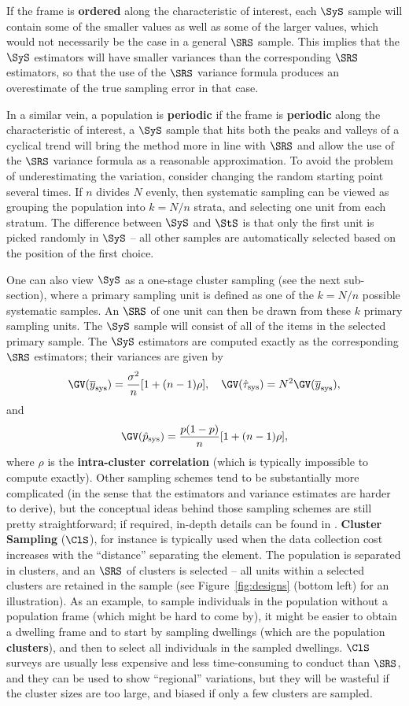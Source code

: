 \par If the frame is \textbf{ordered} along the characteristic of interest, each $\SyS$ sample will contain some of the smaller values as well as some of the larger values, which would not necessarily be the case in a general $\SRS$ sample. This implies that the  $\SyS$ estimators will have smaller variances than the corresponding $\SRS$ estimators, so that the use of the $\SRS$ variance formula produces an overestimate of the true sampling error in that case. \par In a similar vein, a population is \textbf{periodic} if the frame is \textbf{periodic}  along the characteristic of interest, a $\SyS$ sample that hits both the peaks and valleys of a cyclical trend will bring the method more in line with $\SRS$ and allow the use of the $\SRS$ variance formula as a reasonable approximation. To avoid the problem of underestimating the variation, consider changing the random starting point several times.\newl 
If $n$ divides $N$ evenly, then systematic sampling can be viewed as grouping the population into $k=N/n$ strata, and selecting one unit from each stratum. The difference between $\SyS$ and $\StS$ is that only the first unit is picked randomly in $\SyS$ -- all other samples are automatically selected based on the position of the first choice. \par One can also view $\SyS$ as a one-stage cluster sampling (see the next sub-section), where a primary sampling unit is defined as one of the $k=N/n$ possible systematic samples. An $\SRS$ of one unit can then be drawn from these $k$ primary sampling units. The $\SyS$ sample will consist of all of the items in the selected primary sample.
\newl The $\SyS$ estimators are computed exactly as the corresponding $\SRS$ estimators; their variances are given by  
$$\GV(\overline{y}_{\textrm{sys}})=\frac{\sigma^2}{n}[1+(n-1)\rho],\quad  \GV(\hat{\tau}_{\textrm{sys}})=N^2\GV(\overline{y}_{\textrm{sys}}),$$ and $$\GV(\hat{p}_{\textrm{sys}})=\frac{p(1-p)}{n}[1+(n-1)\rho],$$ where $\rho$ is the \textbf{intra-cluster correlation} (which is typically impossible to compute exactly). \newl Other sampling schemes tend to be substantially more complicated (in the sense that the estimators and variance estimates are harder to derive), but the conceptual ideas behind those sampling schemes are still pretty straightforward; if required, in-depth details can be found in \cite{DC_SC}.
\newl \textbf{Cluster Sampling}
 ($\ClS$), for instance is typically used when the data collection cost increases with the ``distance'' separating the element. The population is separated in clusters, and an $\SRS$ of clusters is selected -- all units within a selected clusters are retained in the sample (see Figure~\ref{fig:designs} (bottom left) for an illustration). As an example, to sample individuals in the population without a population frame (which might be hard to come by), it might be easier to obtain a dwelling frame and to start by sampling dwellings (which are the population \textbf{clusters}), and then to select all individuals in the sampled dwellings. $\ClS$ surveys are usually less expensive and less time-consuming to conduct than $\SRS$, and they can be used to show ``regional'' variations, but they will be wasteful if the cluster sizes are too large, and biased if only a few clusters are sampled.  